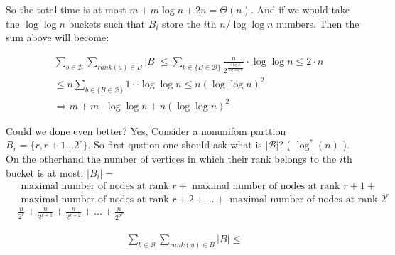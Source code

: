 So the total time is at most $m + m \log n + 2n = \Theta\left( n \right)$. And if we would take the $ \log \log n $ buckets such that $B_{i}$ store the  $i$th $ n /  \log \log n $ numbers. Then the sum above will become:   

\begin{equation*}
  \begin{split}
    & \sum_{ b \in \mathcal{B} }{ \sum_{ rank(u) \in B}{ |B| } }  \le \sum_{ b \in \{ B \in \mathcal{B}  \}  }{ \frac{n}{2^{ \frac{  i \log n} { \log \log n  }  }} \cdot \log \log n }    \le  2\cdot n \\ 
    & \le n  \sum_{ b \in \{ B \in \mathcal{B}  \}  }{ 1 \cdot  \cdot \log \log n }    \le  n \left( \log \log n  \right)^{2}   \\
    & \Rightarrow m + m \cdot \log \log n + n \left( \log \log n  \right)^{2}  
  \end{split}
\end{equation*}

Could we done even better? Yes, Consider a nonunifom parttion $ B_{r} = \{ r,  r+ 1 ... 2^{r} \} $. So first qustion one should ask what is $ |\mathcal{B}|$? ( $ \log^{*}\left( n \right) $ ). On the otherhand the number of vertices in which their rank belongs to the $i$th bucket is at most:    $|B_{i}| =  $ 
\begin{equation*}
  \begin{split}
    & \text{ maximal number of nodes at rank } r + \text{ maximal number of nodes at rank } r+1 + \\ 
    & \text{ maximal number of nodes at rank } r+2 + ... +  \text{ maximal number of nodes at rank } 2^{r} \\  
    & \frac{n}{2^{r}} + \frac{n}{2^{r+1}} + \frac{n}{2^{r+2}} + ... + \frac{n}{2^{2^{r}}}
  \end{split}
\end{equation*}

\begin{equation*}
  \begin{split}
    \sum_{ b \in \mathcal{B} }{ \sum_{ rank(u) \in B}{ |B| } }  \le 
  \end{split}
\end{equation*}





